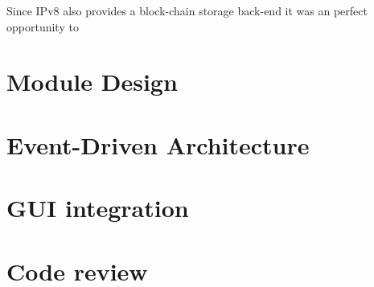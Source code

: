 Since IPv8 also provides a block-chain storage back-end it was an perfect opportunity to 

\section{Module Design}

\section{Event-Driven Architecture}

\section{GUI integration}

\section{Code review}